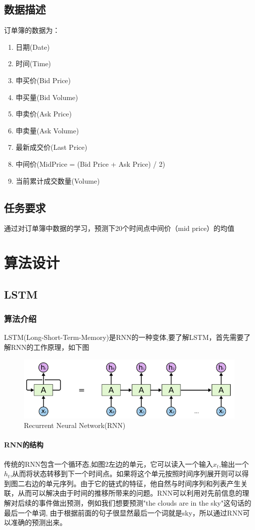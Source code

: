 \documentclass[UTF8]{ctexart}
\begin{document}
\subsection{数据描述}
订单簿的数据为：
\begin{enumerate}[*]
    \item 日期(Date)
    \item 时间(Time)
    \item 申买价(Bid Price)
    \item 申买量(Bid Volume)
    \item 申卖价(Ask Price)
    \item 申卖量(Ask Volume)
    \item 最新成交价(Last Price)
    \item 中间价(MidPrice = (Bid Price + Ask Price) / 2)
    \item 当前累计成交数量(Volume)
\end{enumerate}
\subsection{任务要求}
通过对订单簿中数据的学习，预测下20个时间点中间价（mid price）的均值
\section{算法设计}
\subsection{LSTM}
\subsubsection{算法介绍}
LSTM(Long-Short-Term-Memory)是RNN的一种变体,要了解LSTM，首先需要了解RNN的工作原理，如下图
\begin{figure}[!htbp]
\centering
\includegraphics[scale = 0.8]{p3.png}
\caption{Recurrent Neural Network(RNN)\cite{1}}
\end{figure}
\paragraph*{RNN的结构}
传统的RNN包含一个循环态,如图2左边的单元，它可以读入一个输入$x_t$,输出一个$h_t$,从而将状态转移到下一个时间点。如果将这个单元按照时间序列展开则可以得到图二右边的单元序列。由于它的链式的特征，他自然与时间序列和列表产生关联，从而可以解决由于时间的推移所带来的问题。RNN可以利用对先前信息的理解对后续的事件做出预测，例如我们想要预测"the clouds are in the sky"这句话的最后一个单词, 由于根据前面的句子很显然最后一个词就是sky，所以通过RNN可以准确的预测出来。
\end{document}
